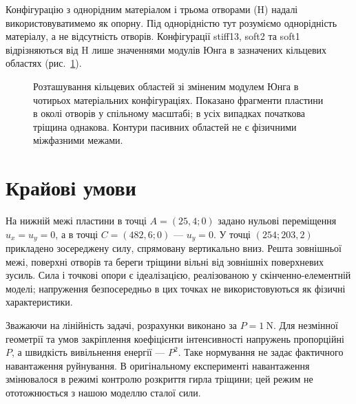 Конфігурацію з однорідним матеріалом і трьома отворами (H) надалі використовуватимемо як опорну. Під однорідністю тут розуміємо однорідність матеріалу, а не відсутність отворів. Конфігурації stiff13, soft2 та soft1 відрізняються від H лише значеннями модулів Юнга в зазначених кільцевих областях (рис.~\ref{fig:initial-architectures}).

\begin{figure}[htbp]
  \centering
  
  \caption{Розташування кільцевих областей зі зміненим модулем Юнга в чотирьох матеріальних конфігураціях. Показано фрагменти пластини в околі отворів у спільному масштабі; в усіх випадках початкова тріщина однакова. Контури пасивних областей не є фізичними міжфазними межами.}
  \label{fig:initial-architectures}
\end{figure}

\section{Крайові умови}
На нижній межі пластини в точці $A=(25{,}4;0)$ задано нульові переміщення $u_x=u_y=0$, а в точці $C=(482{,}6;0)$ --- $u_y=0$. У точці $(254;203{,}2)$ прикладено зосереджену силу, спрямовану вертикально вниз. Решта зовнішньої межі, поверхні отворів та береги тріщини вільні від зовнішніх поверхневих зусиль. Сила і точкові опори є ідеалізацією, реалізованою у скінченно-елементній моделі; напруження безпосередньо в цих точках не використовуються як фізичні характеристики.

Зважаючи на лінійність задачі, розрахунки виконано за $P=\qty{1}{\newton}$. Для незмінної геометрії та умов закріплення коефіцієнти інтенсивності напружень пропорційні $P$, а швидкість вивільнення енергії --- $P^2$. Таке нормування не задає фактичного навантаження руйнування. В оригінальному експерименті навантаження змінювалося в режимі контролю розкриття гирла тріщини; цей режим не ототожнюється з нашою моделлю сталої сили.

